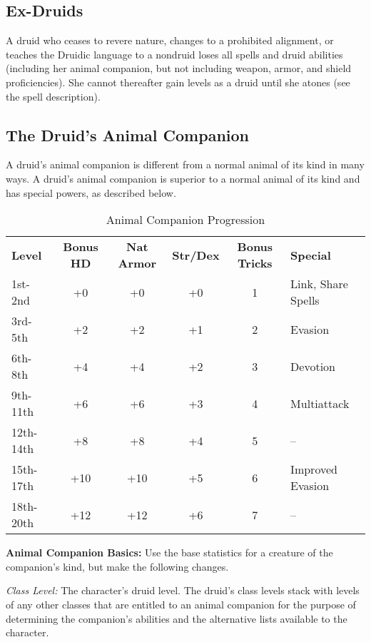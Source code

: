\subsection{Ex-Druids}

A druid who ceases to revere nature, changes to a prohibited alignment, or teaches 
the Druidic language to a nondruid loses all spells and druid abilities (including 
her animal companion, but not including weapon, armor, and shield proficiencies). 
She cannot thereafter gain levels as a druid until she atones (see the  spell description).

\subsection{The Druid's Animal Companion}

A druid's animal companion is different from a normal animal of its kind in many 
ways. A druid's animal companion is superior to a normal animal of its kind and 
has special powers, as described below.

\begin{table}[htb]
\caption{Animal Companion Progression}
\centering
\begin{tabular}{l c c c c l}
\textbf{Level} & \textbf{Bonus HD} & \textbf{Nat Armor} & \textbf{Str/Dex} & \textbf{Bonus Tricks} & \textbf{Special}\\
1st-2nd & +0 & +0 & +0 & 1 & Link, Share Spells\\
3rd-5th & +2 & +2 & +1 & 2 & Evasion\\
6th-8th & +4 & +4 & +2 & 3 & Devotion\\
9th-11th & +6 & +6 & +3 & 4 & Multiattack\\
12th-14th & +8 & +8 & +4 & 5 & --\\
15th-17th & +10 & +10 & +5 & 6 & Improved Evasion\\
18th-20th & +12 & +12 & +6 & 7 & --\\
\end{tabular}
\end{table}

\textbf{Animal Companion Basics:} Use the base statistics for a creature of the 
companion's kind, but make the following changes.

\textit{Class Level:} The character's druid level. The druid's class levels stack 
with levels of any other classes that are entitled to an animal companion for the 
purpose of determining the companion's abilities and the alternative lists available 
to the character.

